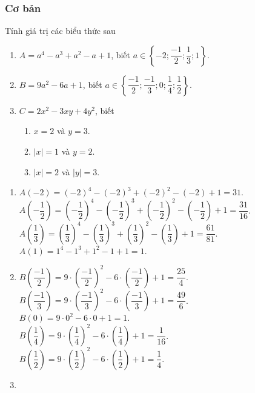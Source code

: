 \subsubsection{Cơ bản}
\begin{bt}%
	Tính giá trị các biểu thức sau
	\begin{enumerate}
		\item $A=a^4-a^3+a^2-a+1$, biết $a \in \left\{-2;\dfrac{-1}{2};\dfrac{1}{3};1\right\}$.
		\item $B=9a^2-6a+1$, biết $a \in \left\{\dfrac{-1}{2};\dfrac{-1}{3};0;\dfrac{1}{4}; \dfrac{1}{2}\right\}$.
		\item $C=2x^2-3xy+4y^2$, biết
		\begin{enumerate}
			\item $x=2$ và $y=3$.
			\item $|x|=1$ và $y=2$.
			\item $|x|=2$ và $|y|=3$.
		\end{enumerate}
	\end{enumerate}
	\loigiai
	{
		\begin{enumerate}
			\item $A(-2)=(-2)^4-(-2)^3+(-2)^2-(-2)+1 = 31$.\\
			$A\left(-\dfrac{1}{2}\right) = \left(-\dfrac{1}{2}\right)^4-\left(-\dfrac{1}{2}\right)^3+\left(-\dfrac{1}{2}\right)^2-\left(-\dfrac{1}{2}\right)+1 = \dfrac{31}{16}$.\\
			$A\left(\dfrac{1}{3}\right) = \left(\dfrac{1}{3}\right)^4 - \left(\dfrac{1}{3}\right)^3 + \left(\dfrac{1}{3}\right)^2 -\left(\dfrac{1}{3}\right) +1 =\dfrac{61}{81}$.\\
			$A (1) = 1^4 -1^3+1^2-1+1 = 1$.
			\item $B\left(\dfrac{-1}{2}\right) = 9 \cdot \left(\dfrac{-1}{2}\right)^2 - 6 \cdot \left(\dfrac{-1}{2}\right) +1 =\dfrac{25}{4}$.\\
			$B\left(\dfrac{-1}{3}\right) =  9\cdot \left(\dfrac{-1}{3}\right)^2 -6 \cdot \left(\dfrac{-1}{3}\right) +1 = \dfrac{49}{6}$.\\
			$B\left(0\right) = 9 \cdot 0^2 -6\cdot 0 +1 =1$.\\
			$B\left(\dfrac{1}{4}\right) = 9\cdot \left(\dfrac{1}{4}\right)^2 -6 \cdot \left(\dfrac{1}{4}\right) +1 =\dfrac{ 1}{16}$.\\
			$B\left(\dfrac{1}{2}\right) = 9\cdot \left(\dfrac{1}{2}\right)^2 -6 \cdot \left(\dfrac{1}{2}\right) +1 = \dfrac{1}{4}$.
			\item \begin{enumerate}

\end{enumerate}
\end{enumerate}}
\end{bt}
